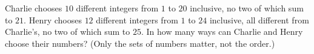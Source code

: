 Charlie chooses $10$ different integers from $1$ to $20$ inclusive, no two of which sum to $21$. Henry chooses $12$ different integers from $1$ to $24$ inclusive, all different from Charlie's, no two of which sum to $25$. In how many ways can Charlie and Henry choose their numbers? (Only the sets of numbers matter, not the order.)
